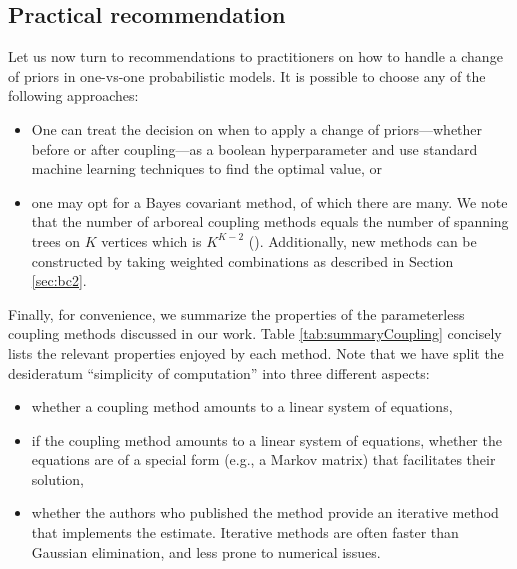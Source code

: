 \documentclass[pdflatex, sn-basic]{sn-jnl}%
\theoremstyle{thmstyleone}%
\theoremstyle{thmstyletwo}%
\theoremstyle{thmstylethree}%
\begin{document}
\subsection{Practical recommendation}

Let us now turn to recommendations to practitioners on how to handle a change of priors in one-vs-one probabilistic models. It is possible to choose any of the following approaches:

\begin{itemize}
\item[1.] One can treat the decision on when to apply a change of priors---whether 
before or after coupling---as a boolean hyperparameter and use standard machine 
learning techniques to find the optimal value, or 
\item[2.] one may opt for a Bayes covariant method, of which there are many. 
We note that the number of arboreal coupling methods equals the number 
of spanning trees on $K$ vertices which is $K^{K-2}$ (\cite{cayley1878theorem}). 
Additionally, new methods can be constructed by taking weighted combinations 
as described in Section \ref{sec:bc2}.
\end{itemize}

Finally, for convenience, we summarize the properties of the parameterless coupling methods discussed in our work.  Table \ref{tab:summaryCoupling} concisely lists the relevant properties enjoyed by each method. Note that we have split the desideratum ``simplicity of computation'' into three different aspects:
\begin{itemize}
	\item whether a coupling method amounts to a linear system of equations,
	\item if the coupling method amounts to a linear system of equations, whether the equations are of a special form (e.g., a Markov matrix) that facilitates their solution,
	\item whether the authors who published the method provide an iterative method that implements the estimate. Iterative methods are often  faster than Gaussian elimination, and less prone to numerical issues.
\end{itemize}



\end{document}
